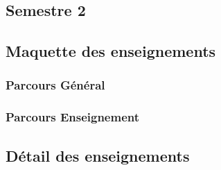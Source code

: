 \documentclass[10pt, a5paper]{report}
\begin{document}
\begin{spacing}{1.5}
\footnotesize

\section*{Semestre 2}
\subsection*{Maquette des enseignements}

\subsubsection*{Parcours Général}



\subsubsection*{Parcours Enseignement}



\subsection*{Détail des enseignements}

\end{spacing}
\end{document}

